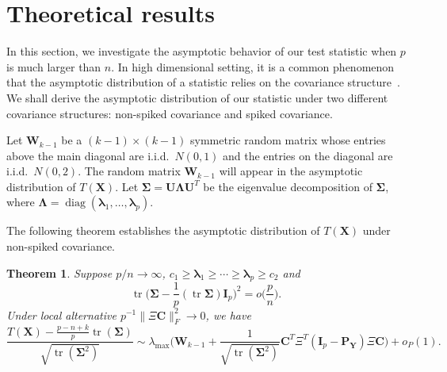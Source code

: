\documentclass[12pt]{article} %
\DeclareMathOperator{\mytr}{tr}
\DeclareMathOperator{\mydiag}{diag}
\newcommand{\bX}{\mathbf{X}}
\newcommand{\bP}{\mathbf{P}}
\newcommand{\bY}{\mathbf{Y}}
\newcommand{\bC}{\mathbf{C}}
\newcommand{\bI}{\mathbf{I}}
\newcommand{\bU}{\mathbf{U}}
\newcommand{\bW}{\mathbf{W}}
\newcommand{\bfsym}[1]{\ensuremath{\boldsymbol{#1}}}
\def\blambda {\bfsym {\lambda}}
\def\bLambda {\bfsym {\Lambda}}
\def\bSigma {\bfsym {\Sigma}}
\newtheorem{theorem}{Theorem}
\theoremstyle{definition}
\begin{document}
   
   
   










\section{Theoretical results}

In this section, we investigate the asymptotic behavior of our test statistic when $p$ is much larger than $n$.
In high dimensional setting, it is a common phenomenon that the asymptotic distribution of a statistic relies on the covariance structure~\citep{Ma2015A}.
We shall derive the asymptotic distribution of our statistic under two different covariance structures: non-spiked covariance and spiked covariance.

Let $\bW_{k-1}$ be a $(k-1)\times(k-1)$ symmetric random matrix whose entries above the main diagonal are i.i.d.\ $N(0,1)$ and the entries on the diagonal are i.i.d.\ $N(0,2)$.
The random matrix $\bW_{k-1}$ will appear in the asymptotic distribution of $T(\bX)$.
Let $\bSigma= \bU\bLambda \bU^T$ be the eigenvalue decomposition of $\bSigma$, where $\bLambda =\mydiag (\blambda_1,\ldots,\blambda_p)$.

The following theorem establishes the asymptotic distribution of $T(\bX)$ under non-spiked covariance.
\begin{theorem}\label{nonSpiked}
    Suppose $p/n\to \infty$, $c_1\geq \blambda_1\geq \cdots\geq \blambda_p\geq c_2$ and
    $$
    \mytr\Big(\bSigma-\frac{1}{p}(\mytr\bSigma)\bI_p\Big)^2=o\big(\frac{p}{n}\big).
    $$
    Under local alternative $p^{-1}\|\Xi \bC\|_F^2\to 0$,
    we have
    $$
    \frac{T(\bX)-\frac{p-n+k}{p}\mytr(\bSigma)}{\sqrt{\mytr(\bSigma^2)}}
    \sim
    \lambda_{\max}\Big( \bW_{k-1} +\frac{1}{\sqrt{\mytr(\bSigma^2)}} \bC^T \Xi^T (\bI_p-\bP_{\bY})\Xi \bC\Big)+o_P(1).
    $$
\end{theorem}
\end{document}
